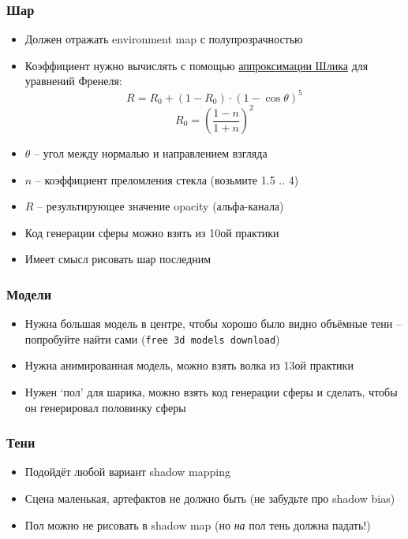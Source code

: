 \documentclass{beamer}
\begin{document}
\begin{frame}[fragile]
\frametitle{Шар}
\begin{itemize}
\item Должен отражать environment map с полупрозрачностью
\item Коэффициент нужно вычислять с помощью \href{https://en.wikipedia.org/wiki/Schlick%27s_approximation}{аппроксимации Шлика} для уравнений Френеля:
\begin{equation}
R = R_0 + (1 - R_0) \cdot (1 - \cos \theta)^5
\end{equation}
\begin{equation}
R_0 = \left(\frac{1-n}{1+n}\right)^2
\end{equation}
\item \begin{math}\theta\end{math} -- угол между нормалью и направлением взгляда
\item \begin{math}n\end{math} -- коэффициент преломления стекла (возьмите 1.5 .. 4)
\item \begin{math}R\end{math} -- результирующее значение opacity (альфа-канала)
\item Код генерации сферы можно взять из 10ой практики
\item Имеет смысл рисовать шар последним
\end{itemize}
\end{frame}

\begin{frame}[fragile]
\frametitle{Модели}
\begin{itemize}
\item Нужна большая модель в центре, чтобы хорошо было видно объёмные тени -- попробуйте найти сами (\verb|free 3d models download|)
\item Нужна анимированная модель, можно взять волка из 13ой практики
\item Нужен `пол' для шарика, можно взять код генерации сферы и сделать, чтобы он генерировал половинку сферы
\end{itemize}
\end{frame}

\begin{frame}[fragile]
\frametitle{Тени}
\begin{itemize}
\item Подойдёт любой вариант shadow mapping
\item Сцена маленькая, артефактов не должно быть (не забудьте про shadow bias)
\item Пол можно не рисовать в shadow map (но \textit{на} пол тень должна падать!)
\end{itemize}
\end{frame}
\end{document}

